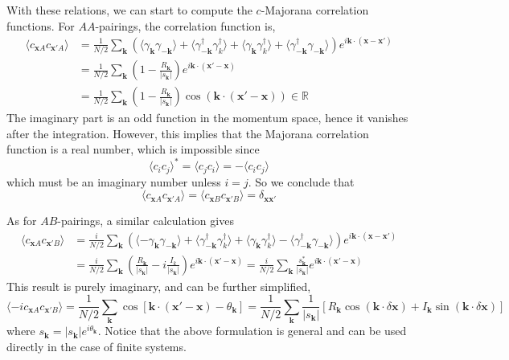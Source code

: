 \documentclass[12font]{article}
\numberwithin{equation}{section}    %
\theoremstyle{definition}
\newcommand{\anglelr}[1]{\langle #1 \rangle}
\newcommand{\lr}[1]{\left(  #1  \right)}
\newcommand{\lrm}[1]{\left[  #1  \right]}
\newcommand{\abs}[1]{\left|  #1  \right|}
\newcommand{\bo}[1]{\mathbf{#1}}
\begin{document}
With these relations, we can start to compute the $c$-Majorana correlation functions. For $AA$-pairings, the correlation function is,
\begin{align*}
  \anglelr{c_{\bo{x}A}c_{\bo{x}'A}} &= \frac{1}{N/2}\sum_{\bo{k}}\lr{ \anglelr{\gamma_{\bo{k}}\gamma_{-\bo{k}}} + \anglelr{\gamma_{-\bo{k}}^\dagger\gamma^\dagger_{k}} +
  \anglelr{\gamma_{\bo{k}}\gamma_{k}^\dagger} + 
  \anglelr{\gamma_{-\bo{k}}^\dagger\gamma_{-\bo{k}}}
  }e^{i\bo{k}\cdot\lr{\bo{x}-\bo{x'}}} \\
  &= \frac{1}{N/2}\sum_{\bo{k}}\lr{1-\frac{R_{\bo{k}}}{\abs{s_{\bo{k}}}}}e^{i\bo{k}\cdot\lr{\bo{x}'-\bo{x}}} \\
  &= \frac{1}{N/2}\sum_{\bo{k}}\lr{1-\frac{R_{\bo{k}}}{\abs{s_{\bo{k}}}}}\cos\lr{\bo{k}\cdot\lr{\bo{x}'-\bo{x}}} \in \mathbb{R}
\end{align*}
The imaginary part is an odd function in the momentum space, hence it vanishes after the integration. However, this implies that the Majorana correlation function is a real number, which is impossible since
\[
\anglelr{c_ic_j}^* = \anglelr{c_jc_i} = -\anglelr{c_ic_j}
\]
which must be an imaginary number unless $i=j$. So we conclude that
\begin{equation}\label{correlationAA.e}
  \anglelr{c_{\bo{x}A}c_{\bo{x'}A}} = \anglelr{c_{\bo{x}B}c_{\bo{x'}B}} = \delta_{\bo{x}\bo{x'}}
\end{equation}


As for $AB$-pairings, a similar calculation gives
\begin{align*}
  \anglelr{c_{\bo{x}A}c_{\bo{x}'B}} &= \frac{i}{N/2}\sum_{\bo{k}}\lr{ \anglelr{-\gamma_{\bo{k}}\gamma_{-\bo{k}}} + \anglelr{\gamma_{-\bo{k}}^\dagger\gamma^\dagger_{k}} +
  \anglelr{\gamma_{\bo{k}}\gamma_{k}^\dagger} - 
  \anglelr{\gamma_{-\bo{k}}^\dagger\gamma_{-\bo{k}}}
  }e^{i\bo{k}\cdot\lr{\bo{x}-\bo{x'}}} \\
  &= \frac{i}{N/2}\sum_{\bo{k}}\lr{\frac{R_{\bo{k}}}{\abs{s_{\bo{k}}}} - i\frac{I_k}{\abs{s_{\bo{k}}}}}e^{i\bo{k}\cdot\lr{\bo{x}'-\bo{x}}} = \frac{i}{N/2}\sum_{\bo{k}}\frac{s^*_{\bo{k}}}{\abs{s_{\bo{k}}}}e^{i\bo{k}\cdot\lr{\bo{x}'-\bo{x}}} 
\end{align*}
This result is purely imaginary, and can be further simplified,
\begin{equation}\label{eq:correlationAB}
  \anglelr{-ic_{\bo{x}A}c_{\bo{x}'B}} 
  = 
  \frac{1}{N/2}\sum_{\bo{k}}\cos\lrm{\bo{k}\cdot\lr{\bo{x}'-\bo{x}} - \theta_{\bo{k}}} 
  = 
  \frac{1}{N/2}
  \sum_{\bo{k}}
  \frac{1}{\abs{s_{\bo{k}}}}\lrm{R_{\bo{k}} \cos\lr{\bo{k} \cdot \delta\bo{x}} + I_{\bo{k}}\sin\lr{\bo{k}\cdot\delta\bo{x}} }
\end{equation}
where $s_{\bo{k}} = \abs{s_{\bo{k}}}e^{i\theta_{\bo{k}}}$. Notice that the above formulation is general and can be used directly in the case of finite systems.
\end{document}
